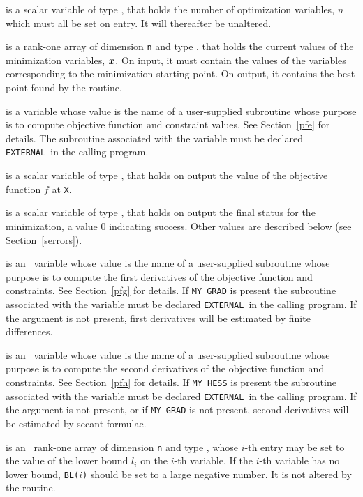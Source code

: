 \documentclass{galahad}
\newcommand{\external}{{\tt EXTERNAL}}
\begin{document}
\begin{description}
 is a scalar variable of type \integer, that holds
the number of optimization variables, $n$ which must all be set on entry. It
will thereafter be unaltered.

 is a rank-one array of dimension {\tt n} and type
\realdp, that holds the current values of the
minimization variables, ${\bm{x}}$. On input, it must contain the values of the
variables corresponding to the minimization starting point.  On output, it
contains the best point found by the routine.

 is a variable whose value is the name of a
user-supplied subroutine whose purpose is to compute objective function
and constraint values. See Section~\ref{pfe} for details.
The subroutine associated with the variable must be declared \external\
in the calling program.

 is a scalar variable of type \realdp, that
holds  on output the value of the objective function $f$ at {\tt X}.

 is a scalar variable of type \integer, that holds
on output the final status for the minimization, a value 0 indicating
success.  Other values are described below (see Section~\ref{serrors}).

 is an \optional\ variable whose value is the name of a
user-supplied subroutine whose purpose is to compute the first derivatives
of the objective function and constraints. See Section~\ref{pfg} for details.
If {\tt MY\_GRAD} is present the subroutine associated with the variable must be
declared \external\ in the calling program. If the argument is not present,
first derivatives will be estimated by finite differences.

 is an \optional\ variable whose value is the name of a
user-supplied subroutine whose purpose is to compute the second derivatives
of the objective function and constraints. See Section~\ref{pfh} for details.
If {\tt MY\_HESS} is present the subroutine associated with the variable must be
declared \external\ in the calling program. If the argument is not present,
or if {\tt MY\_GRAD} is not present,
second derivatives will be estimated by secant formulae.

 is an \optional\ rank-one array of dimension {\tt n} and type
 \realdp, whose $i$-th entry may be set
to the value of the lower bound $l_i$ on the $i$-th variable.
If the $i$-th variable has no lower bound, {\tt BL($i$)} should be set to
a large negative number. It is not altered by the routine.


\end{description}
\end{document}
